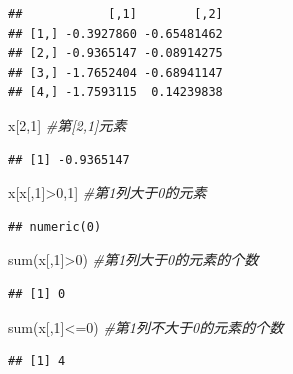 \documentclass[
]{book}
\newenvironment{Shaded}{\begin{snugshade}}{\end{snugshade}}
\newcommand{\CommentTok}[1]{\textcolor[rgb]{0.56,0.35,0.01}{\textit{#1}}}
\newcommand{\DecValTok}[1]{\textcolor[rgb]{0.00,0.00,0.81}{#1}}
\newcommand{\FunctionTok}[1]{\textcolor[rgb]{0.00,0.00,0.00}{#1}}
\newcommand{\NormalTok}[1]{#1}
\newcommand{\SpecialCharTok}[1]{\textcolor[rgb]{0.00,0.00,0.00}{#1}}
\begin{document}
\begin{verbatim}
##            [,1]        [,2]
## [1,] -0.3927860 -0.65481462
## [2,] -0.9365147 -0.08914275
## [3,] -1.7652404 -0.68941147
## [4,] -1.7593115  0.14239838
\end{verbatim}

\begin{Shaded}
\begin{Highlighting}[]
\NormalTok{x[}\DecValTok{2}\NormalTok{,}\DecValTok{1}\NormalTok{] }\CommentTok{\#第[2,1]元素}
\end{Highlighting}
\end{Shaded}

\begin{verbatim}
## [1] -0.9365147
\end{verbatim}

\begin{Shaded}
\begin{Highlighting}[]
\NormalTok{x[x[,}\DecValTok{1}\NormalTok{]}\SpecialCharTok{\textgreater{}}\DecValTok{0}\NormalTok{,}\DecValTok{1}\NormalTok{] }\CommentTok{\#第1列大于0的元素}
\end{Highlighting}
\end{Shaded}

\begin{verbatim}
## numeric(0)
\end{verbatim}

\begin{Shaded}
\begin{Highlighting}[]
\FunctionTok{sum}\NormalTok{(x[,}\DecValTok{1}\NormalTok{]}\SpecialCharTok{\textgreater{}}\DecValTok{0}\NormalTok{) }\CommentTok{\#第1列大于0的元素的个数}
\end{Highlighting}
\end{Shaded}

\begin{verbatim}
## [1] 0
\end{verbatim}

\begin{Shaded}
\begin{Highlighting}[]
\FunctionTok{sum}\NormalTok{(x[,}\DecValTok{1}\NormalTok{]}\SpecialCharTok{\textless{}=}\DecValTok{0}\NormalTok{) }\CommentTok{\#第1列不大于0的元素的个数}
\end{Highlighting}
\end{Shaded}

\begin{verbatim}
## [1] 4
\end{verbatim}
\end{document}
